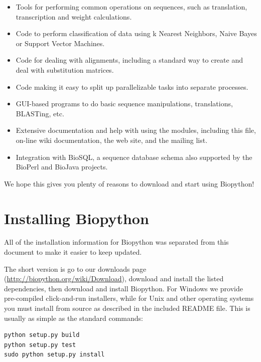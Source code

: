 \documentclass{report}
\begin{document}
\begin{itemize}
  \item Tools for performing common operations on sequences, such as translation, transcription and weight calculations.

  \item Code to perform classification of data using k Nearest Neighbors, Naive Bayes or Support Vector Machines.

  \item Code for dealing with alignments, including a standard way to create and deal with substitution matrices.

  \item Code making it easy to split up parallelizable tasks into separate processes.

  \item GUI-based programs to do basic sequence manipulations, translations, BLASTing, etc.

  \item Extensive documentation and help with using the modules, including this file, on-line wiki documentation, the web site, and the mailing list.

  \item Integration with BioSQL, a sequence database schema also supported by the BioPerl and BioJava projects.

\end{itemize}

We hope this gives you plenty of reasons to download and start using Biopython!

\section{Installing Biopython}

All of the installation information for Biopython was separated from
this document to make it easier to keep updated.

The short version is go to our downloads page (\url{http://biopython.org/wiki/Download}),
download and install the listed dependencies, then download and install Biopython.
For Windows we provide pre-compiled click-and-run installers, while for Unix and other
operating systems you must install from source as described in the included README file.
This is usually as simple as the standard commands:

\begin{verbatim}
python setup.py build
python setup.py test
sudo python setup.py install
\end{verbatim}
\end{document}
